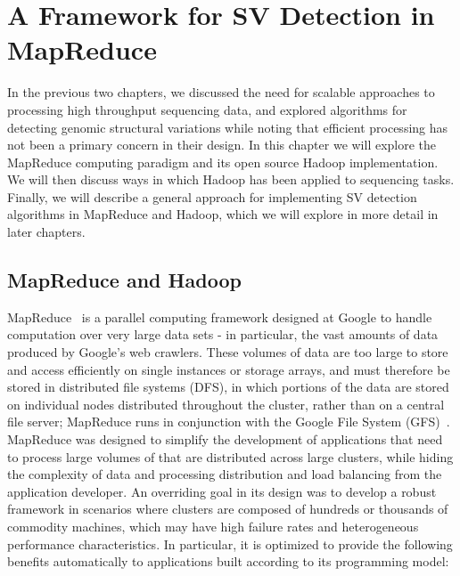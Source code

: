 \chapter{A Framework for SV Detection in MapReduce}\label{chap_framework}

In the previous two chapters, we discussed the need for scalable approaches to processing high throughput sequencing data, and explored algorithms for detecting genomic structural variations while noting that efficient processing has not been a primary concern in their design. In this chapter we will explore the MapReduce computing paradigm and its open source Hadoop implementation. We will then discuss ways in which Hadoop has been applied to sequencing tasks. Finally, we will describe a general approach for implementing SV detection algorithms in MapReduce and Hadoop, which we will explore in more detail in later chapters.

\section{MapReduce and Hadoop}\label{section_hadoop_description}

MapReduce~\cite{Dean:2008p277} is a parallel computing framework designed at Google to handle computation over very large data sets - in particular, the vast amounts of data produced by Google's web crawlers. These volumes of data are too large to store and access efficiently on single instances or storage arrays, and must therefore be stored in distributed file systems (DFS), in which portions of the data are stored on individual nodes distributed throughout the cluster, rather than on a central file server; MapReduce runs in conjunction with the Google File System (GFS)~\cite{Ghemawat:2003:GFS:945445.945450}. MapReduce was designed to simplify the development of applications that need to process large volumes of that are distributed across large clusters, while hiding the complexity of data and processing distribution and load balancing from the application developer. An overriding goal in its design was to develop a robust framework in scenarios where clusters are composed of hundreds or thousands of commodity machines, which may have high failure rates and heterogeneous performance characteristics. In particular, it is optimized to provide the following benefits automatically to applications built according to its programming model:

